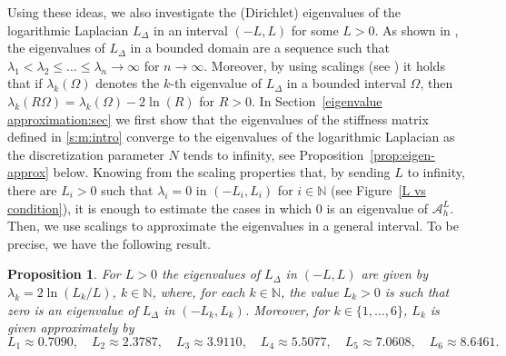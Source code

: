 \documentclass[11 pt]{article}
\newtheorem{proposition}[theorem]{Proposition}
\numberwithin{equation}{section}
\def\N{\mathbb{N}}
\begin{document}
Using these ideas, we also investigate the (Dirichlet) eigenvalues of the logarithmic Laplacian $L_{\Delta}$ in an interval $(-L,L)$ for some $L>0$. As shown in \cite[Theorem 1.4]{CW19}, the eigenvalues of $L_{\Delta}$ in a bounded domain are a sequence such that $\lambda_1<\lambda_2\leq \ldots\leq\lambda_n\to \infty$ for $n\to\infty$.  Moreover, by using scalings (see \cite[Lemma 2.5]{LW21}) it holds that if $\lambda_k(\Omega)$ denotes the $k$-th eigenvalue of $L_{\Delta}$ in a bounded interval $\Omega$, then $\lambda_k(R\Omega)=\lambda_k(\Omega)-2\ln(R)$ for $R>0$. In Section~\ref{eigenvalue approximation:sec} we first show that the eigenvalues of the stiffness matrix defined in \eqref{s:m:intro} converge to the eigenvalues of the logarithmic Laplacian as the discretization parameter $N$ tends to infinity, see Proposition~\ref{prop:eigen-approx} below. Knowing from the scaling properties that, by sending $L$ to infinity, there are $L_i>0$ such that $\lambda_i=0$ in $(-L_i,L_i)$  for $i\in \N$ (see Figure~\ref{L vs condition}), it is enough to estimate the cases in which $0$ is an eigenvalue of $\mathcal{A}^L_h$. Then, we use scalings to approximate the eigenvalues in a general interval. To be precise, we have the following result.
\begin{proposition}\label{eigenvalue approximation}
For $L>0$ the eigenvalues of $L_{\Delta}$ in $(-L,L)$ are given by $\lambda_k=2\ln(L_k/L)$, $k\in \N$, where, for each $k\in \N$, the value $L_k>0$ is such that zero is an eigenvalue of $L_{\Delta}$ in $(-L_k,L_k)$. Moreover, for $k\in\{1,\ldots,6\}$, $L_k$ is given approximately by
\begin{equation*}
L_1\approx 0.7090, \quad L_2\approx 2.3787,\quad L_3\approx 3.9110,\quad L_4\approx 5.5077, \quad L_5\approx 7.0608,\quad L_6\approx 8.6461.
\end{equation*}
\end{proposition}
%
\end{document}
